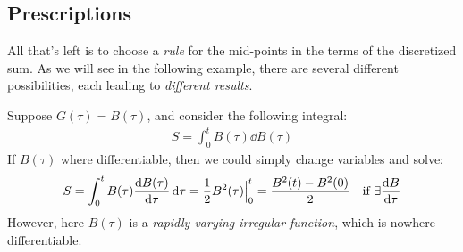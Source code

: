 \documentclass[../template.tex]{subfiles}
\begin{document}
\subsection{Prescriptions}
All that's left is to choose a \textit{rule} for the mid-points in the terms of the discretized sum. As we will see in the following example, there are several different possibilities, each leading to \textit{different results}.  

\begin{example}
    Suppose $G(\tau) = B(\tau)$, and consider the following integral:
    \begin{align*}
        S = \int_0^t B(\tau) \dd{B(\tau)}
    \end{align*} 
    If $B(\tau)$ where differentiable, then we could simply change variables and solve:
    \begin{align*}
        S = \int_0^t B(\tau) \dv{B(\tau)}{\tau} \dd{\tau} = \frac{1}{2} B^2(\tau) \Big|_0^t = \frac{B^2(t) - B^2(0)}{2} \quad \text{if } \exists \dv{B}{\tau}  
    \end{align*} 
    However, here $B(\tau)$ is a \textit{rapidly varying irregular function}, which is nowhere differentiable.


\end{example}
\end{document}

